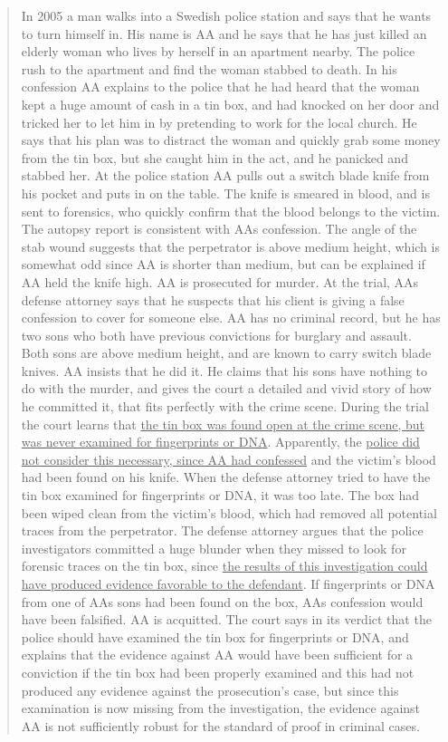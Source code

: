 \documentclass[
  10pt,
  dvipsnames,enabledeprecatedfontcommands]{scrartcl}
\begin{document}
\begin{quote}
In 2005 a man walks into a Swedish police station and says that he wants to turn himself in. His
name is AA and he says that he has just killed an elderly woman who lives by herself in an
apartment nearby. The police rush to the apartment and find the woman stabbed to death. In
his confession AA explains to the police that he had heard that the woman kept a huge amount
of cash in a tin box, and had knocked on her door and tricked her to let him in by pretending to
work for the local church. He says that his plan was to distract the woman and quickly grab
some money from the tin box, but she caught him in the act, and he panicked and stabbed her.
At the police station AA pulls out a switch blade knife from his pocket and puts in on the table.
The knife is smeared in blood, and is sent to forensics, who quickly confirm that the blood
belongs to the victim. The autopsy report is consistent with AAs confession. The angle of the
stab wound suggests that the perpetrator is above medium height, which is somewhat odd
since AA is shorter than medium, but can be explained if AA held the knife high. AA is
prosecuted for murder. At the trial, AAs defense attorney says that he suspects that his client
is giving a false confession to cover for someone else. AA has no criminal record, but he has
two sons who both have previous convictions for burglary and assault. Both sons are above
medium height, and are known to carry switch blade knives. AA insists that he did it. He claims
that his sons have nothing to do with the murder, and gives the court a detailed and vivid story
of how he committed it, that fits perfectly with the crime scene. During the trial the court
learns that \underline{the tin box was found open at the crime scene, but was never examined for
fingerprints or DNA}. Apparently, the \underline{police did not consider this necessary, since AA had
confessed} and the victim’s blood had been found on his knife. When the defense attorney
tried to have the tin box examined for fingerprints or DNA, it was too late. The box had been
wiped clean from the victim’s blood, which had removed all potential traces from the
perpetrator. The defense attorney argues that the police investigators committed a huge
blunder when they missed to look for forensic traces on the tin box, since \underline{the results of this
investigation could have produced evidence favorable to the defendant}. If fingerprints or DNA
from one of AAs sons had been found on the box, AAs confession would have been falsified.
AA is acquitted. The court says in its verdict that the police should have examined the tin box
for fingerprints or DNA, and explains that the evidence against AA would have been sufficient
for a conviction if the tin box had been properly examined and this had not produced any
evidence against the prosecution’s case, but since this examination is now missing from the
investigation, the evidence against AA is not sufficiently robust for the standard of proof in
criminal cases.
\end{quote}
\end{document}
